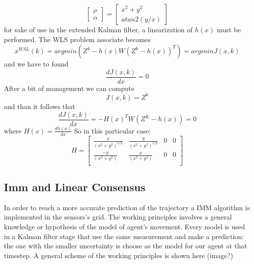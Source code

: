 \documentclass[twocolumn]{article}
\begin{document}
    \begin{equation*}
        \begin{bmatrix}
            \rho\\ \alpha
        \end{bmatrix}=  
        \begin{bmatrix}
            x^2+y^2\\ atan2(y/x)
        \end{bmatrix} 
    \end{equation*}
   for sake of use in the extended Kalman filter, a linearization of $h(x)$ must be performed.
   The WLS problem associate becomes
   \begin{equation*}
       x^{WSL}(k)=arg min(Z^{k}-h(x)W(Z^{k}-h(x))^{T})= argmin J(x,k)
   \end{equation*}
   and we have to found 
   \begin{equation*}
     \frac{dJ(x,k)}{dx}=0
\end{equation*}
After a bit of management we can compute 
\begin{equation*}
    J(x,k)=Z^{k}
\end{equation*}
        and than it follows that
        \begin{equation*}
            \frac{dJ(x,k)}{dx}=-H(x)^{T}W(Z^{K}-h(x))=0
        \end{equation*}
        where $H(x)=\frac{dh(x)}{dx}$ So in this particular case:
    \begin{equation}
        H= \begin{bmatrix}
            \frac{x}{(x^{2}+y^{2})^{1/2}} & \frac{y}{(x^{2}+y^{2})^{1/2}}& 0& 0 \\
            \frac{-y}{(x^{2}+y^{2})}  & \frac{x}{(x^{2}+y^{2})}& 0& 0 \\
        \end{bmatrix}
    \end{equation}
    \subsection*{Imm and Linear Consensus}
    In order to reach a more accurate prediction of the trajectory a IMM algorithm is implemented in the sensors's grid. The working principles 
    involves a general knowledge or hypothesis of the model of agent's movement. Every model is used in a Kalman filter stage that use the same measurement and make
    a prediction: the one with the smaller uncertainty is choose as the model for our agent at that timestep. A general scheme of the working principles is shown here (image?)
\end{document}
